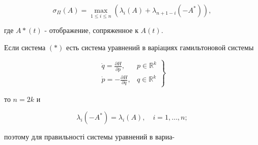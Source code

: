 \documentclass[10pt]{article}
\begin{document}
\[

\sigma_{\Pi}(A)=\max _{1 \leqslant i \leqslant n}\left(\lambda_{i}(A)+\lambda_{n+1-i}\left(-A^{*}\right)\right),

\]



где $A *(t)$ - отображение, сопряженное к $A(t)$.



Если система $(*)$ есть система уравнений в варіациях гамильтоновой системы



\[

\left.\begin{array}{ll}

\dot{q}=\frac{\partial H}{\partial p}, & p \in \mathbb{R}^{k} \\

\dot{p}=-\frac{\partial H}{\partial q}, & q \in \mathbb{R}^{k}

\end{array}\right\}

\]



то $n=2 k$ и



\[

\lambda_{i}\left(-A^{*}\right)=\lambda_{i}(A), \quad i=1, \ldots, n ;

\]



поэтому для правильності системы уравнений в вариа-
\end{document}

